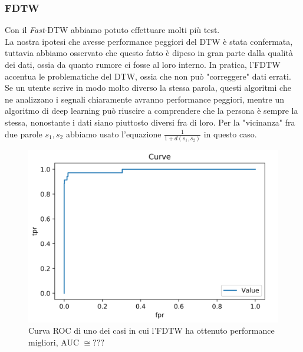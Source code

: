 \documentclass[8pt,notitlepage]{report}
\begin{document}
		\newpage		
		
		\subsubsection{FDTW}
			Con il \textit{Fast}-DTW  abbiamo potuto effettuare molti più test. \\ 
			La nostra ipotesi che avesse performance peggiori del DTW è stata confermata, tuttavia abbiamo osservato che questo fatto è dipeso in gran parte dalla qualità dei dati, ossia da quanto rumore ci fosse al loro interno. In pratica, l'FDTW accentua le problematiche del DTW, ossia che non può "correggere" dati errati. Se un utente scrive in modo molto diverso la stessa parola, questi algoritmi che ne analizzano i segnali chiaramente avranno performance peggiori, mentre un algoritmo di deep learning può riuscire a comprendere che la persona è sempre la stessa, nonostante i dati siano piuttosto diversi fra di loro. Per la "vicinanza" fra due parole $ s_1, s_2 $ abbiamo usato l'equazione $ \frac{1}{1 + d(s_1, s_2)} $ in questo caso.
			
			\begin{figure}[H]
				\begin{center}
					\includegraphics[scale=.35]{ROC_FDTW_Giovanni}
					\caption{Curva ROC di uno dei casi in cui l'FDTW ha ottenuto performance migliori, AUC $ \cong ??? $}
				\end{center}
			\end{figure}
			
\end{document}
